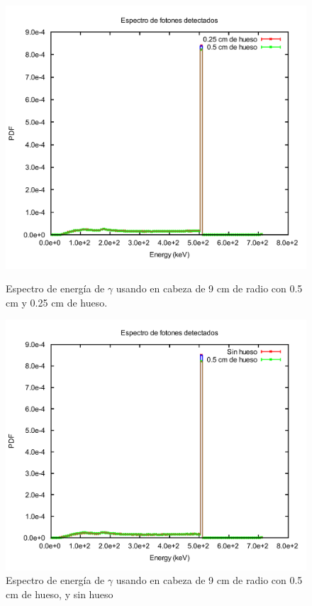 \documentclass[12pt,a4paper,onecolumn]{article}
\begin{document}
\begin{figure}[H]
	\centering
	\begin{minipage}{0.45\textwidth}
		\centering
		\includegraphics[scale=0.3]{025_05hueso}
		\caption{Espectro de energía de $\gamma$ usando  en cabeza de 9 cm de radio con 0.5 cm y 0.25 cm de hueso.} 
		\label{fig:02505hueso}
	\end{minipage}
	\hspace{5mm}
	\begin{minipage}{0.45\textwidth}
		\centering
		\includegraphics[scale=0.3]{2sinhueso05cmhueso}
		\caption{Espectro de energía de $\gamma$ usando  en cabeza de 9 cm de radio con 0.5 cm de hueso, y sin hueso}
		\label{fig:2sinhueso05cmhueso}  
\end{minipage}	
\end{figure}
\end{document}

